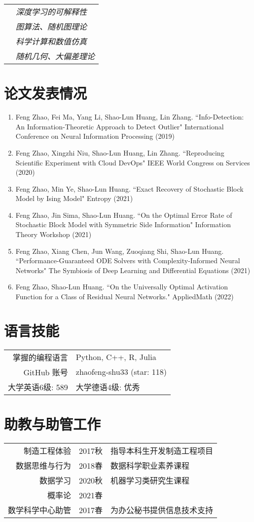 \documentclass[12pt,colorlinks,linkcolor=true]{moderncv}
\begin{document}
\begin{tabular}{rl}
 	 & \textit{深度学习的可解释性}\\
 & \textit{图算法、随机图理论}\\
  & \textit{科学计算和数值仿真}\\ 
  & \textit{随机几何、大偏差理论}\\ 
 \end{tabular}
 \section{论文发表情况}
 \begin{enumerate}
     \item Feng Zhao, Fei Ma, Yang Li, Shao-Lun Huang, Lin Zhang. ``Info-Detection: An Information-Theoretic Approach to Detect Outlier" International Conference on Neural Information Processing (2019)
     \item Feng Zhao, Xingzhi Niu, Shao-Lun Huang, Lin Zhang. ``Reproducing Scientific Experiment with Cloud DevOps" IEEE World Congress on Services (2020)
     \item Feng Zhao, Min Ye, Shao-Lun Huang. ``Exact Recovery of Stochastic Block Model by Ising Model" Entropy (2021)
     \item Feng Zhao, Jin Sima, Shao-Lun Huang. ``On the Optimal Error Rate of Stochastic Block Model with Symmetric Side Information" Information Theory Workshop (2021)
     \item Feng Zhao, Xiang Chen, Jun Wang, Zuoqiang Shi, Shao-Lun Huang. ``Performance-Guaranteed ODE Solvers with Complexity-Informed Neural Networks" The Symbiosis of Deep Learning and Differential Equations (2021)
     \item Feng Zhao, Shao-Lun Huang. ``On the Universally Optimal Activation Function for a Class of Residual Neural Networks." AppliedMath (2022)
 \end{enumerate}
 
\section{语言技能}
\begin{tabular}{rl}
    掌握的编程语言
    & Python, C++,
    R, Julia \\
    GitHub 账号 & zhaofeng-shu33 (star: 118) \\
    大学英语6级: 589 & 大学德语4级: 优秀\\
    \end{tabular}
\section{助教与助管工作}
\begin{tabular}{rll}
    制造工程体验   & 2017秋 & 指导本科生开发制造工程项目\\
    数据思维与行为 & 2018春 & 数据科学职业素养课程\\
    数据学习 &  2020秋 & 机器学习类研究生课程 \\
    概率论 &   2021春 & \\
    数学科学中心助管 & 2017春 & 为办公秘书提供信息技术支持
\end{tabular}
\end{document}
